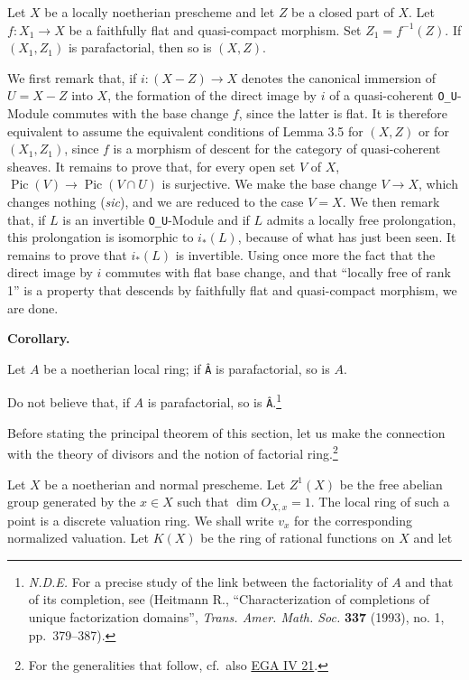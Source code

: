 \documentclass[
  11pt,
  a4paper,
]{book}
\begin{document}
Let \(X\) be a locally noetherian prescheme and let \(Z\) be a closed
part of \(X\). Let \(f: X_{1} \to X\) be a faithfully flat and
quasi-compact morphism. Set \(Z_{1} = f^{-1}(Z)\). If \((X_{1}, Z_{1})\)
is parafactorial, then so is \((X, Z)\).

We first remark that, if \(i: (X - Z) \to X\) denotes the canonical
immersion of \(U = X - Z\) into \(X\), the formation of the direct image
by \(i\) of a quasi-coherent \texttt{O\_U}-Module commutes with the base
change \(f\), since the latter is flat. It is therefore equivalent to
assume the equivalent conditions of Lemma 3.5 for \((X, Z)\) or for
\((X_{1}, Z_{1})\), since \(f\) is a morphism of descent for the
category of quasi-coherent sheaves. It remains to prove that, for every
open set \(V\) of \(X\),
\(\operatorname{Pic}(V) \to \operatorname{Pic}(V \cap U)\) is
surjective. We make the base change \(V \to X\), which changes nothing
(\emph{sic}), and we are reduced to the case \(V = X\). We then remark
that, if \(L\) is an invertible \texttt{O\_U}-Module and if \(L\) admits
a locally free prolongation, this prolongation is isomorphic to
\(i_{*}(L)\), because of what has just been seen. It remains to prove
that \(i_{*}(L)\) is invertible. Using once more the fact that the
direct image by \(i\) commutes with flat base change, and that ``locally
free of rank 1'' is a property that descends by faithfully flat and
quasi-compact morphism, we are done.

\textbf{Corollary.}

Let \(A\) be a noetherian local ring; if \texttt{Â} is parafactorial, so
is \(A\).

Do not believe that, if \(A\) is parafactorial, so is
\texttt{Â}.\footnote{\emph{N.D.E.} For a precise study of the link
  between the factoriality of \(A\) and that of its completion, see
  (Heitmann R., ``Characterization of completions of unique
  factorization domains'', \emph{Trans. Amer. Math. Soc.} \textbf{337}
  (1993), no. 1, pp.~379--387).}

Before stating the principal theorem of this section, let us make the
connection with the theory of divisors and the notion of factorial
ring.\footnote{For the generalities that follow, cf.~also
  \href{https://jcreinhold.github.io/ega/iv/34-ch4-21-divisors.html\#21-divisors}{EGA
  IV 21}.}

Let \(X\) be a noetherian and normal prescheme. Let \(Z^{1}(X)\) be the
free abelian group generated by the \(x \in X\) such that
\(\dim O_{X,x} = 1\). The local ring of such a point is a discrete
valuation ring. We shall write \(v_{x}\) for the corresponding
normalized valuation. Let \(K(X)\) be the ring of rational functions on
\(X\) and let
\end{document}
